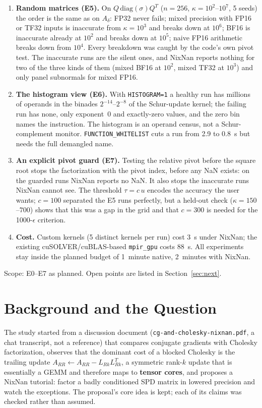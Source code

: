 \documentclass[11pt,a4paper]{article}
\begin{document}
\begin{enumerate}
  \item \textbf{Random matrices (E5).} On $Q\,\mathrm{diag}(\sigma)Q^T$ ($n=256$, $\kappa=10^{2}$--$10^{7}$, 5 seeds) the order is the same as on $A_\delta$: FP32 never fails; mixed precision with FP16 or TF32 inputs is inaccurate from $\kappa=10^{3}$ and breaks down at $10^{6}$; BF16 is inaccurate already at $10^{2}$ and breaks down at $10^{5}$; naive FP16 arithmetic breaks down from $10^{4}$.
  Every breakdown was caught by the code's own pivot test. The inaccurate runs are the silent ones, and NixNan reports nothing for two of the three kinds of them (mixed BF16 at $10^{2}$, mixed TF32 at $10^{3}$) and only panel subnormals for mixed FP16.
  \item \textbf{The histogram view (E6).} With \texttt{HISTOGRAM=1} a healthy run has millions of operands in the binades $2^{-14}$--$2^{-8}$ of the Schur-update kernel; the failing run has none, only exponent~0 and exactly-zero values, and the zero bin names the instruction.
  The histogram is an operand census, not a Schur-complement monitor. \texttt{FUNCTION\_WHITELIST} cuts a run from 2.9 to 0.8~s but needs the full demangled name.
  \item \textbf{An explicit pivot guard (E7).} Testing the relative pivot before the square root stops the factorization with the pivot index, before any NaN exists: on the guarded runs NixNan reports no NaN. It also stops the inaccurate runs NixNan cannot see.
  The threshold $\tau=c\,u$ encodes the accuracy the user wants; $c=100$ separated the E5 runs perfectly, but a held-out check ($\kappa=150$--$700$) shows that this was a gap in the grid and that $c=300$ is needed for the 1000-$\epsilon$ criterion.
  \item \textbf{Cost.} Custom kernels (5 distinct kernels per run) cost 3~s under NixNan; the existing cuSOLVER/cuBLAS-based \texttt{mpir\_gpu}
  costs 88~s. All experiments stay inside the planned budget of 1~minute native, 2~minutes with NixNan.
\end{enumerate}

Scope: E0--E7 as planned. Open points are listed in Section~\ref{sec:next}.

\section{Background and the Question}

The study started from a discussion document (\texttt{cg-and-cholesky-nixnan.pdf}, a chat transcript, not a reference) that compares conjugate gradients with Cholesky
factorization, observes that the dominant cost of a blocked Cholesky is the trailing update $A_{RR}\leftarrow A_{RR}-L_{Rk}L_{Rk}^T$, a symmetric rank-$k$ update that is
essentially a GEMM and therefore maps to \textbf{tensor cores}, and proposes a NixNan tutorial: factor a badly conditioned SPD matrix in lowered precision and watch the exceptions.
The proposal's core idea is kept; each of its claims was checked rather than assumed.
\end{document}
